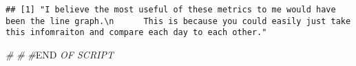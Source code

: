 \documentclass[]{article}
\newenvironment{Shaded}{\begin{snugshade}}{\end{snugshade}}
\newcommand{\CommentTok}[1]{\textcolor[rgb]{0.56,0.35,0.01}{\textit{#1}}}
\newcommand{\RegionMarkerTok}[1]{#1}
\begin{document}
\begin{verbatim}
## [1] "I believe the most useful of these metrics to me would have been the line graph.\n      This is because you could easily just take this infomraiton and compare each day to each other."
\end{verbatim}

\begin{Shaded}
\begin{Highlighting}[]
\CommentTok{#}
\CommentTok{#}
\CommentTok{#}\RegionMarkerTok{END}\CommentTok{ OF SCRIPT}
\end{Highlighting}
\end{Shaded}
\end{document}
